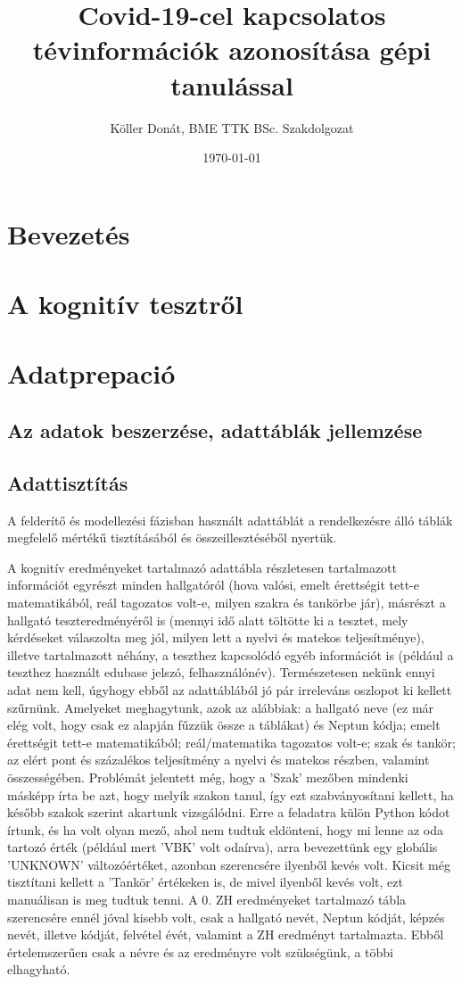 \documentclass[12pt]{article}
\title{Covid-19-cel kapcsolatos tévinformációk azonosítása gépi tanulással}
\author{Köller Donát, BME TTK BSc. Szakdolgozat}
\date{\today}
\begin{document}
\tableofcontents


\section{Bevezetés}

\section{A kognitív tesztről}

\section{Adatprepació}

\subsection{Az adatok beszerzése, adattáblák jellemzése}



\subsection{Adattisztítás}

A felderítő és modellezési fázisban használt adattáblát a rendelkezésre álló táblák megfelelő mértékű tisztításából és összeillesztéséből nyertük.

A kognitív eredményeket tartalmazó adattábla részletesen tartalmazott információt egyrészt minden hallgatóról (hova valósi, emelt érettségit tett-e matematikából, reál tagozatos volt-e, milyen szakra és tankörbe jár), másrészt a hallgató teszteredményéről is (mennyi idő alatt töltötte ki a tesztet, mely kérdéseket válaszolta meg jól, milyen lett a nyelvi és matekos teljesítménye), illetve tartalmazott néhány, a teszthez kapcsolódó egyéb információt is (például a teszthez használt edubase jelszó, felhasználónév). Természetesen nekünk ennyi adat nem kell, úgyhogy ebből az adattáblából jó pár irreleváns oszlopot ki kellett szűrnünk. Amelyeket meghagytunk, azok az alábbiak: a hallgató neve (ez már elég volt, hogy csak ez alapján fűzzük össze a táblákat) és Neptun kódja; emelt érettségit tett-e matematikából; reál/matematika tagozatos volt-e; szak és tankör; az elért pont és százalékos teljesítmény a nyelvi és matekos részben, valamint összességében. Problémát jelentett még, hogy a ’Szak’ mezőben mindenki másképp írta be azt, hogy melyik szakon tanul, így ezt szabványosítani kellett, ha később szakok szerint akartunk vizsgálódni. Erre a feladatra külön Python kódot írtunk, és ha volt olyan mező, ahol nem tudtuk eldönteni, hogy mi lenne az oda tartozó érték (például mert ’VBK’ volt odaírva), arra bevezettünk egy globális ’UNKNOWN’ változóértéket, azonban szerencsére ilyenből kevés volt. Kicsit még tisztítani kellett a ’Tankör’ értékeken is, de mivel ilyenből kevés volt, ezt manuálisan is meg tudtuk tenni.
A 0. ZH eredményeket tartalmazó tábla szerencsére ennél jóval kisebb volt, csak a hallgató nevét, Neptun kódját, képzés nevét, illetve kódját, felvétel évét, valamint a ZH eredményt tartalmazta. Ebből értelemszerűen csak a névre és az eredményre volt szükségünk, a többi elhagyható.
\end{document}
